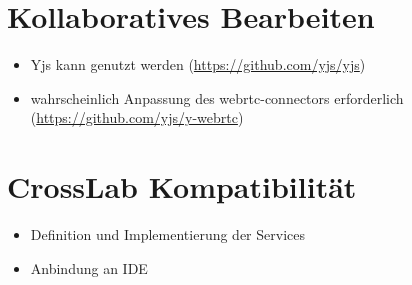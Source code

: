 \section{Kollaboratives Bearbeiten}

\begin{itemize}
    \item Yjs kann genutzt werden (\href{https://github.com/yjs/yjs}{https://github.com/yjs/yjs})
    \item wahrscheinlich Anpassung des webrtc-connectors erforderlich \\ (\href{https://github.com/yjs/y-webrtc}{https://github.com/yjs/y-webrtc})
\end{itemize}

\section{CrossLab Kompatibilität}

\begin{itemize}
    \item Definition und Implementierung der Services
    \item Anbindung an IDE
\end{itemize}